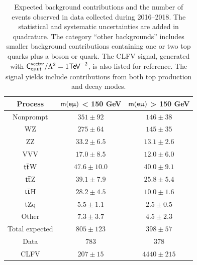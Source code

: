\begin{table}[th]
\sffamily
\centering
\caption{Expected background contributions and the number of events observed in data collected during 2016--2018. The statistical and systematic uncertainties are added in quadrature. The category ``other backgrounds'' includes smaller background contributions containing one or two top quarks plus a boson or quark. The \ac{CLFV} signal, generated with $\textsf{C}^{\textsf{vector}}_{\textsf{e}\upmu\textsf{{u}t}}/\mathrm{\Lambda}^2=1\textsf{TeV}^{-2}$, is also listed for reference. The signal yields include contributions from both top production and decay modes.}
\begin{tabular}{ccc}
\toprule
Process & $\textsf{m}(\textsf{e}\upmu)$ < 150 GeV & $\textsf{m}(\textsf{e}\upmu)$ > 150 GeV \\
\midrule
Nonprompt & $351\pm92$ & $146\pm38$\\
WZ & $275\pm64$ & $145\pm35$\\
ZZ & $33.2\pm6.5$ & $13.1\pm2.6$\\
VVV & $17.0\pm8.5$ & $12.0\pm6.0$\\
$\textsf{t}\overline{\textsf{t}}$W & $47.6\pm10.0$ & $40.0\pm9.1$\\
$\textsf{t}\overline{\textsf{t}}$Z & $39.1\pm7.9$ & $25.8\pm5.4$\\
$\textsf{t}\overline{\textsf{t}}$H & $28.2\pm4.5$ & $10.0\pm1.6$\\
tZq & $5.5\pm1.1$ & $2.5\pm0.5$\\
Other & $7.3\pm3.7$ & $4.5\pm2.3$\\
Total expected & $805\pm123$ & $398\pm57$\\
Data & 783 & 378\\
\midrule
CLFV & $207\pm15$ & $4440\pm215$\\
\bottomrule
\end{tabular}
\label{tab:eventcount}
\end{table}